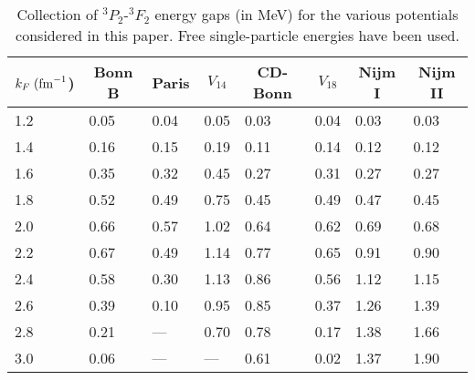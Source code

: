 
\begin{table}[t]
\begin{center}
\begin{tabular}{llllllll} 
\multicolumn{1}{c}{$k_F\;({\rm fm}^{-1}$)}&\multicolumn{1}{c}{Bonn B}&
\multicolumn{1}{c}{Paris}&\multicolumn{1}{c}{$V_{14}$}& 
\multicolumn{1}{c}{CD-Bonn}&\multicolumn{1}{c}{$V_{18}$}&
\multicolumn{1}{c}{Nijm I}&\multicolumn{1}{c}{Nijm II} \\ \hline  
     1.2  & 0.05 & 0.04  & 0.05 & 0.03 & 0.04 & 0.03 & 0.03  \\
     1.4  & 0.16 & 0.15  & 0.19 & 0.11 & 0.14 & 0.12 & 0.12  \\
     1.6  & 0.35 & 0.32  & 0.45 & 0.27 & 0.31 & 0.27 & 0.27  \\
     1.8  & 0.52 & 0.49  & 0.75 & 0.45 & 0.49 & 0.47 & 0.45 \\
     2.0  & 0.66 & 0.57  & 1.02 & 0.64 & 0.62 & 0.69 & 0.68 \\
     2.2  & 0.67 & 0.49  & 1.14 & 0.77 & 0.65 & 0.91 & 0.90 \\
     2.4  & 0.58 & 0.30  & 1.13 & 0.86 & 0.56 & 1.12 & 1.15 \\
     2.6  & 0.39 & 0.10  & 0.95 & 0.85 & 0.37 & 1.26 & 1.39 \\
     2.8  & 0.21 & ---  & 0.70 & 0.78 & 0.17 & 1.38 & 1.66 \\
     3.0  & 0.06 & ---  & --- & 0.61 & 0.02 & 1.37 & 1.90 \\ \hline  
\end{tabular}
\caption{Collection of $^3P_2$-$^3F_2$ energy gaps (in MeV) for the 
various potentials considered in this paper.  
Free single-particle energies have been used.}
\label{tab:tab1}
\end{center}
\end{table} 


